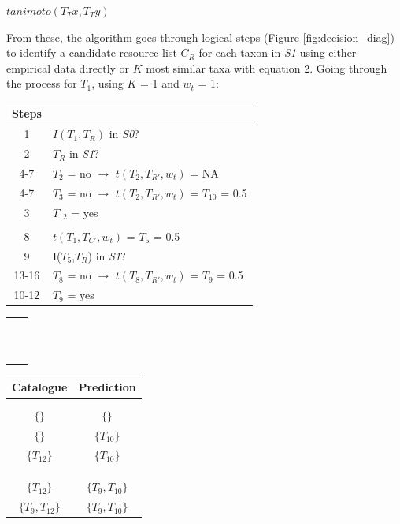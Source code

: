 \documentclass[letterpaper]{article}
\begin{document}
    \centerline{$tanimoto(T_Tx, T_Ty)$}
\bigskip

From these, the algorithm goes through logical steps (Figure \ref{fig:decision_diag}) to identify a candidate resource list $C_R$ for each taxon in \textit{S1} using either empirical data directly or $K$ most similar taxa with equation 2. Going through the process for $T_1$, using $K$ = 1 and $w_t$ = 1:
\bigskip

\begin{table}[h!]
  \centering
  \small
  \begin{tabular}{cl}
      Steps \\
      \hline
      1        &$I(T_1,T_R)$ in \textit{S0}? \\
      2        &$T_R$ in \textit{S1}? \\
      4-7      &$T_2$ = no $\rightarrow$ $t(T_2, T_{R'}, w_t)$ = NA   \\
      4-7      &$T_3$ = no $\rightarrow$ $t(T_2, T_{R'}, w_t)$ = $T_{10}$ = 0.5 \\
      3        &$T_{12}$ = yes    \\  \\
      8        &$t(T_1, T_{C'}, w_t)$ = $T_5$ = 0.5            \\
      9        &I($T_5$,$T_R$) in \textit{S1}? \\
      13-16    &$T_8$ = no $\rightarrow$ $t(T_8, T_{R'}, w_t)$ = $T_9$ = 0.5  \\
      10-12    &$T_9$ = yes   \\
  \end{tabular}
  \begin{tabular}{c|c}
     & \\  \\  \\  \\  \\  \\  \\  \\  \\  \\  \\
  \end{tabular}
  \begin{tabular}{cc}
      Catalogue   & Prediction \\
      \hline \\ \\
      $\{\}$    & $\{\}$            \\
      $\{\}$    & $\{T_{10}\}$      \\
      $\{T_{12}\}$    & $\{T_{10}\}$      \\  \\  \\ \\
      $\{T_{12}\}$    & $\{T_9, T_{10}\}$      \\
      $\{T_9, T_{12}\}$    & $\{T_9, T_{10}\}$      \\
  \end{tabular}
\end{table}
\bigskip
\end{document}
